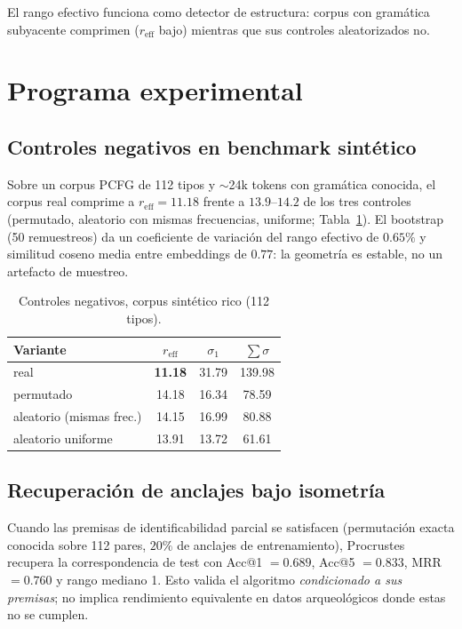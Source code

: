 \documentclass[10pt,twocolumn]{article}
\begin{document}
El rango efectivo funciona como detector de estructura: corpus con
gramática subyacente comprimen ($r_{\mathrm{eff}}$ bajo) mientras que sus
controles aleatorizados no.

\section{Programa experimental}
\label{sec:experimentos}

\subsection{Controles negativos en benchmark sintético}

Sobre un corpus PCFG de 112 tipos y $\sim$24k tokens con gramática
conocida, el corpus real comprime a $r_{\mathrm{eff}}=11.18$ frente a
$13.9$--$14.2$ de los tres controles (permutado, aleatorio con mismas
frecuencias, uniforme; Tabla~\ref{tab:controles}). El bootstrap (50
remuestreos) da un coeficiente de variación del rango efectivo de
$0.65\%$ y similitud coseno media entre embeddings de $0.77$: la
geometría es estable, no un artefacto de muestreo.

\begin{table}[t]
\centering
\small
\caption{Controles negativos, corpus sintético rico (112 tipos).}
\label{tab:controles}
\begin{tabular}{lccc}
\toprule
Variante & $r_{\mathrm{eff}}$ & $\sigma_1$ & $\sum\sigma$\\
\midrule
real & \textbf{11.18} & 31.79 & 139.98\\
permutado & 14.18 & 16.34 & 78.59\\
aleatorio (mismas frec.) & 14.15 & 16.99 & 80.88\\
aleatorio uniforme & 13.91 & 13.72 & 61.61\\
\bottomrule
\end{tabular}
\end{table}

\subsection{Recuperación de anclajes bajo isometría}

Cuando las premisas de identificabilidad parcial se satisfacen
(permutación exacta conocida sobre 112 pares, $20\%$ de anclajes de
entrenamiento), Procrustes recupera la correspondencia de test con
Acc@1 $=0.689$, Acc@5 $=0.833$, MRR $=0.760$ y rango mediano 1. Esto
valida el algoritmo \emph{condicionado a sus premisas}; no implica
rendimiento equivalente en datos arqueológicos donde estas no se cumplen.
\end{document}

